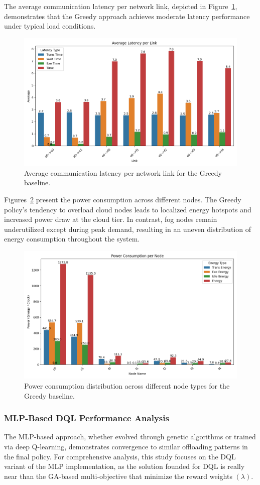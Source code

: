 \documentclass[preprint,3p,authoryear]{elsarticle}
\begin{document}
The average communication latency per network link, depicted in Figure~\ref{fig:greedy-avg-latency}, demonstrates that the Greedy approach achieves moderate latency performance under typical load conditions. 

\begin{figure}[H]
    \centering
    \includegraphics[width=0.5\linewidth]{figs/Greedy/avg_latency_per_link.png}
    \caption{Average communication latency per network link for the Greedy baseline.}
    \label{fig:greedy-avg-latency}
\end{figure}


Figures~\ref{fig:greedy-power-consumption} present the power consumption across different nodes. The Greedy policy's tendency to overload cloud nodes leads to localized energy hotspots and increased power draw at the cloud tier. In contrast, fog nodes remain underutilized except during peak demand, resulting in an uneven distribution of energy consumption throughout the system.

\begin{figure}[H]
    \centering
    \includegraphics[width=0.5\linewidth]{figs/Greedy/power_consumption_per_node.png}
    \caption{Power consumption distribution across different node types for the Greedy baseline.}
    \label{fig:greedy-power-consumption}
\end{figure}


\subsubsection{MLP-Based DQL Performance Analysis}\label{subsubsec:mlp-DQL-analysis}

The MLP-based approach, whether evolved through genetic algorithms or trained via deep Q-learning, demonstrates convergence to similar offloading patterns in the final policy. For comprehensive analysis, this study focuses on the DQL variant of the MLP implementation, as the solution founded for DQL is really near than the GA-based multi-objective that minimize the reward weights $(\lambda)$.
\end{document}
